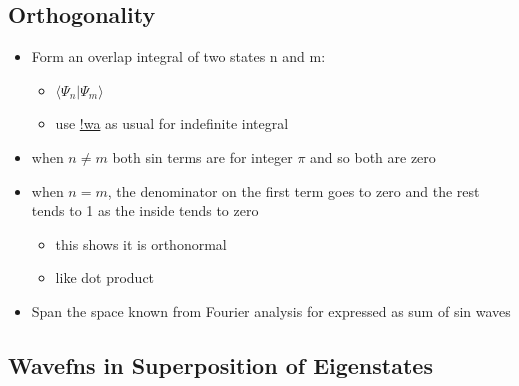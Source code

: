 \documentclass[a4paper,11pt,normalem]{article}
\begin{document}
\subsection{Orthogonality}\label{orthogonality}

\begin{itemize}
\item
  Form an overlap integral of two states n and m:
  \begin{itemize}
  \item
    \(\langle\Psi_{n}|\Psi_{m}\rangle\)
  \item
    use \href{www.wolframalpha.com}{!wa} as usual for indefinite
    integral
  \end{itemize}
\item
  when \(n \neq m\) both sin terms are for integer \(\pi\) and so both
  are zero
\item
  when \(n = m\), the denominator on the first term goes to zero and the
  rest tends to 1 as the inside tends to zero
  \begin{itemize}
  \item
    this shows it is orthonormal
  \item
    like dot product
  \end{itemize}
\item
  Span the space known from Fourier analysis for expressed as sum of sin
  waves
\end{itemize}

\subsection{Wavefns in Superposition of Eigenstates}\label{wavefns-in-superposition-of-eigenstates}
\end{document}
